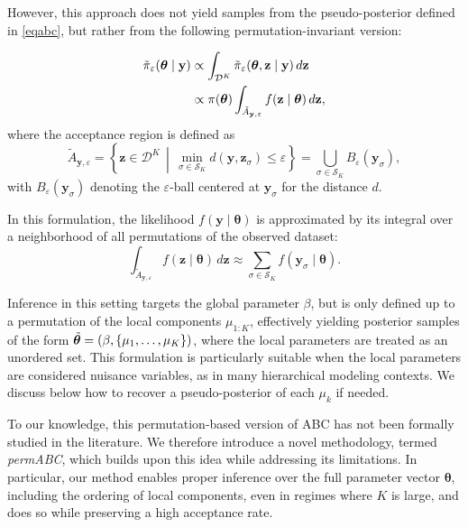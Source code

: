 \documentclass[11pt,a4paper]{article}
\def\dataspace{\mathcal{D}}
\def\globparam{\beta}
\def\locparam{\mu}
\def\obsdata{\mathbf{y}}
\def\param{\boldsymbol{\theta}}
\def\simdata{\mathbf{z}}
\theoremstyle{plain}
\theoremstyle{definition}
\theoremstyle{remark}
\begin{document}
However, this approach does not yield samples from the pseudo-posterior defined in \eqref{eqabc}, but rather from the following permutation-invariant version:

\begin{equation} 
    \label{eqpermabc_tilde}
    \begin{split}
        \Tilde \pi_{\varepsilon} (\param \mid \obsdata)  & \propto \int_{\dataspace^K} \Tilde \pi_{\varepsilon} (\param , \simdata \mid \obsdata) \, d\simdata \\
        & \propto \pi(\param) \int_{\Tilde A_{\obsdata,\varepsilon}} f(\simdata \mid \param) \, d\simdata,
    \end{split}
\end{equation}
where the acceptance region is defined as
\[
\tilde{A}_{\obsdata,\varepsilon} = \left\{\simdata \in \dataspace^K \,\middle|\, \min_{\sigma \in \mathcal{S}_K} d(\obsdata, \simdata_{\sigma}) \leq \varepsilon \right\} = \bigcup_{\sigma \in \mathcal{S}_K} B_{\varepsilon}(\obsdata_{\sigma}),
\]
with \( B_{\varepsilon}(\obsdata_{\sigma}) \) denoting the \( \varepsilon \)-ball centered at \( \obsdata_{\sigma} \) for the distance \( d \).

In this formulation, the likelihood \( f(\obsdata \mid \param) \) is approximated by its integral over a neighborhood of all permutations of the observed dataset:
\[
\int_{\tilde{A}_{\obsdata,\varepsilon}} f(\simdata \mid \param) \, d\simdata \approx \sum_{\sigma \in \mathcal{S}_K} f(\obsdata_{\sigma} \mid \param).
\]

Inference in this setting targets the global parameter \( \globparam \), but is only defined up to a permutation of the local components \( \locparam_{1:K} \), effectively yielding posterior samples of the form \( \Tilde{\param} = (\globparam, \{\locparam_1, \dots, \locparam_K\})\),
where the local parameters are treated as an unordered set. This formulation is particularly suitable when the local parameters are considered nuisance variables, as in many hierarchical modeling contexts. We discuss below how to recover a pseudo-posterior of each $\mu_k$ if needed.

To our knowledge, this permutation-based version of ABC has not been formally studied in the literature. We therefore introduce a novel methodology, termed \emph{permABC}, which builds upon this idea while addressing its limitations. In particular, our method enables proper inference over the full parameter vector \( \param \), including the ordering of local components, even in regimes where \( K \) is large, and does so while preserving a high acceptance rate.
\end{document}
